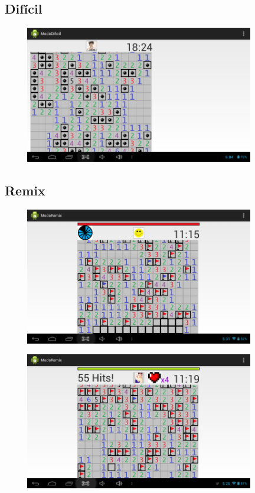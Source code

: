 \documentclass[12pt]{article}
\begin{document}
\subsection{Difícil}

\begin{minipage}{0.1\textwidth}
\includegraphics[height=6cm,width=12cm]{dificil} 
\end{minipage}

\subsection{Remix}

\begin{minipage}{0.1\textwidth}
\includegraphics[height=6cm,width=12cm]{remix} 
\end{minipage}

\begin{minipage}{0.1\textwidth}
\includegraphics[height=6cm,width=12cm]{remix2} 
\end{minipage}
\end{document}
